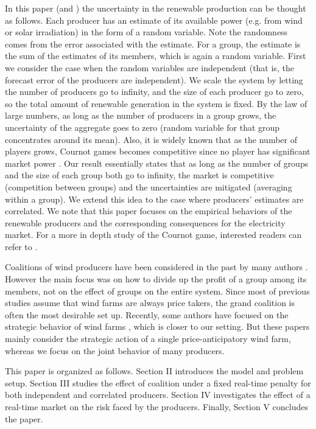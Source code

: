 \documentclass[journal]{IEEEtran}
\begin{document}
In this paper (and \cite{Zhang14}) the uncertainty in the renewable production can be thought as follows. Each producer has an estimate of its available power (e.g. from wind or solar irradiation) in the form of a random variable. Note the randomness comes from the error associated with the estimate.  For a group, the estimate is the sum of the estimates of its members, which is again a random variable. First we consider the case when the random variables are independent (that is, the forecast error of the producers are independent). We scale the system by letting the number of producers go to infinity, and the size of each producer go to zero, so the total amount of renewable generation in the system is fixed. By the law of large numbers, as long as the number of producers in a group grows, the uncertainty of the aggregate goes to zero (random variable for that group concentrates around its mean). Also, it is widely known that as the number of players grows, Cournot games becomes competitive since no player has significant market power \cite{Johari05}. Our result essentially states that as long as the number of groups and the size of each group both go to infinity, the market is competitive (competition between groups) and the uncertainties are mitigated (averaging within a group). We extend this idea to the case where producers' estimates are correlated.  We note that this paper focuses on the empirical behaviors of the renewable producers and the corresponding consequences for the electricity market. For a more in depth study of the Cournot game, interested readers can refer to \cite{Zhang14}.

Coalitions of wind producers have been considered in the past by many authors \cite{Zhao13,Pinson13,Bitar12,Baeyens13,Nayyar13}. However the main focus was on how to divide up the profit of a group among its members, not on the effect of groups on the entire system. Since most of previous studies assume that wind farms are always price takers, the grand coalition is often the most desirable set up. Recently, some authors have focused on the strategic behavior of wind farms \cite{Nieta14,Sharma14}, which is closer to our setting. But these papers mainly consider the strategic action of a single price-anticipatory wind farm, whereas we focus on the joint behavior of many producers. 

This paper is organized as follows. Section II introduces the model and problem setup. Section III studies the effect of coalition under a fixed real-time penalty for both independent and correlated producers. Section IV investigates the effect of a real-time market on the risk faced by the producers.  Finally, Section V concludes the paper. 
	
\end{document}
